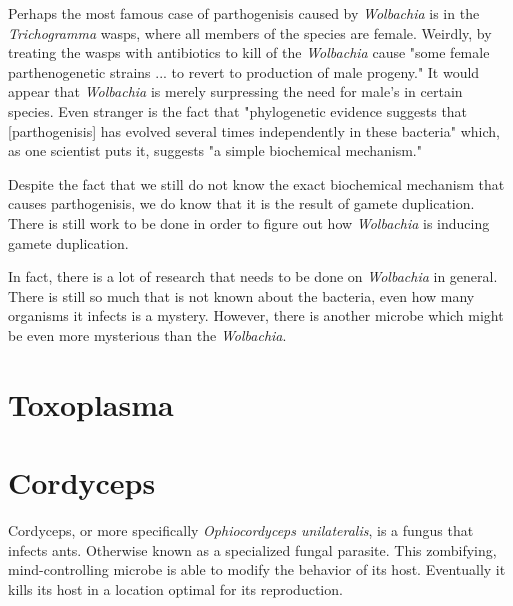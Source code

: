 \documentclass[twocolumn]{article}
\begin{document}
Perhaps the most famous case of parthogenisis caused by \textit{Wolbachia} is in the \textit{Trichogramma} wasps, where all members of the species are female. Weirdly, by treating the wasps with antibiotics to kill of the \textit{Wolbachia} cause "some female parthenogenetic strains ... to revert to production of male progeny."\cite{Wpar_removal} It would appear that \textit{Wolbachia} is merely surpressing the need for male's in certain species. Even stranger is the fact that "phylogenetic evidence suggests that [parthogenisis] has evolved several times independently in these bacteria" which, as one scientist puts it, suggests "a simple biochemical mechanism."\cite{Wbio}  

Despite the fact that we still do not know the exact biochemical mechanism that causes parthogenisis, we do know that it is the result of gamete duplication.\cite{Wgamete_duplication} There is still work to be done in order to figure out how \textit{Wolbachia} is inducing gamete duplication.

In fact, there is a lot of research that needs to be done on \textit{Wolbachia} in general. There is still so much that is not known about the bacteria, even how many organisms it infects is a mystery. However, there is another microbe which might be even more mysterious than the \textit{Wolbachia}.

\section*{Toxoplasma}

\section*{Cordyceps}
Cordyceps, or more specifically \textit{Ophiocordyceps unilateralis}, is a fungus that infects ants. Otherwise known as a specialized fungal parasite. This zombifying, mind-controlling microbe is able to modify the behavior of its host. Eventually it kills its host in a location optimal for its reproduction. 
\end{document}
